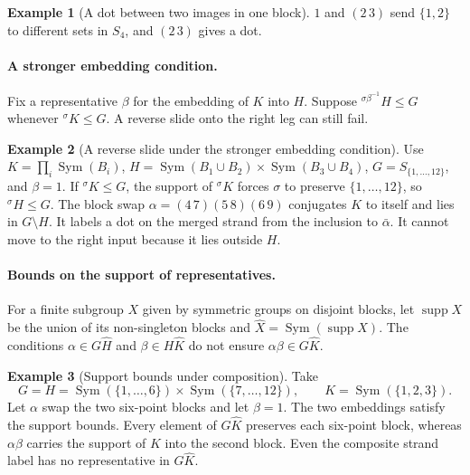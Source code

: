 \documentclass[11pt,a4paper]{article}
\numberwithin{equation}{section}
\theoremstyle{definition}
\newtheorem{example}{Example}[section]
\newcommand{\cg}[2]{{}^{#1}\!#2}
\begin{document}
\begin{example}[A dot between two images in one block]\label{ex:dot-in-one-block}
\(1\) and \((2\,3)\) send \(\{1,2\}\) to different
sets in \(S_4\), and \((2\,3)\) gives a dot.
\end{example}

\paragraph{A stronger embedding condition.}
Fix a representative \(\beta\) for the embedding of \(K\) into \(H\).
Suppose \(\cg{\sigma\beta^{-1}}{H}\le G\) whenever
\(\cg{\sigma}{K}\le G\). A reverse slide onto the right leg
can still fail.

\begin{example}[A reverse slide under the stronger embedding condition]\label{ex:stronger-slide-obstruction}
Use
\(K=\prod_i\operatorname{Sym}(B_i)\),
\(H=\operatorname{Sym}(B_1\cup B_2)\times\operatorname{Sym}(B_3\cup B_4)\),
\(G=S_{\{1,\ldots,12\}}\), and \(\beta=1\). If
\(\cg{\sigma}{K}\le G\), the support of \(\cg{\sigma}{K}\) forces
\(\sigma\) to preserve \(\{1,\ldots,12\}\), so
\(\cg{\sigma}{H}\le G\). The block swap \(\alpha=(4\,7)(5\,8)(6\,9)\)
conjugates \(K\) to itself and lies in \(G\setminus H\).
It labels a dot on the merged strand from the inclusion to
\(\bar\alpha\). It cannot move to the right input because it lies
outside \(H\).
\end{example}

\paragraph{Bounds on the support of representatives.}
For a finite subgroup \(X\) given by symmetric groups on disjoint
blocks, let \(\operatorname{supp}X\) be the union of its non-singleton blocks
and \(\widehat X=\operatorname{Sym}(\operatorname{supp}X)\). The conditions
\(\alpha\in G\widehat H\) and \(\beta\in H\widehat K\) do not ensure
\(\alpha\beta\in G\widehat K\).


\begin{example}[Support bounds under composition]\label{ex:support-composite}
Take
\[
 G=H=\operatorname{Sym}(\{1,\ldots,6\})
         \times\operatorname{Sym}(\{7,\ldots,12\}),
 \qquad K=\operatorname{Sym}(\{1,2,3\}).
\]
Let \(\alpha\) swap the two six-point blocks and let \(\beta=1\).
The two embeddings satisfy the support bounds.
Every element of \(G\widehat K\) preserves each six-point block,
whereas \(\alpha\beta\) carries the support of \(K\) into the second
block. Even the composite strand label has no representative
in \(G\widehat K\).
\end{example}
\end{document}
